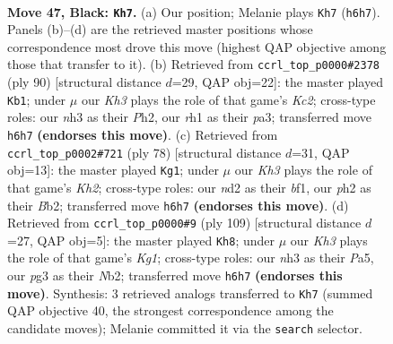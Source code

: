 \documentclass[11pt]{article}
\begin{document}
\clearpage

\begin{figure}[p]\centering
\begin{subfigure}{0.46\textwidth}\centering
\resizebox{\linewidth}{!}{%
\newchessgame
\chessboard[
  setfen={1r6/8/1pb4k/p1p1r3/8/2P2pPN/1K1N3P/7R b - - 1 47},
  showmover=false,
  pgfstyle=straightmove, color=movearrow, markmove={h6-h7}
]}
\caption{}
\end{subfigure}\hfill
\begin{subfigure}{0.46\textwidth}\centering
\resizebox{\linewidth}{!}{%
\newchessgame
\chessboard[
  setfen={r7/1p4k1/2p5/2P2R1B/3PnP2/p3P2p/2K4P/8 w - - 1 46},
  showmover=false,
  pgfstyle=straightmove, color=movearrow, markmove={c2-b1}
]}
\caption{}
\end{subfigure}
\\[4pt]
\begin{subfigure}{0.46\textwidth}\centering
\resizebox{\linewidth}{!}{%
\newchessgame
\chessboard[
  setfen={2r5/5k2/6pp/6p1/p7/P4P1P/1B1R2PK/5b2 w - - 4 40},
  showmover=false,
  pgfstyle=straightmove, color=movearrow, markmove={h2-g1}
]}
\caption{}
\end{subfigure}\hfill
\begin{subfigure}{0.46\textwidth}\centering
\resizebox{\linewidth}{!}{%
\newchessgame
\chessboard[
  setfen={6k1/R7/5p1N/p2r2pp/8/P6P/1n4PK/8 b - - 3 55},
  showmover=false,
  pgfstyle=straightmove, color=movearrow, markmove={g8-h8}
]}
\caption{}
\end{subfigure}
\caption{\textbf{Move 47, Black: \texttt{Kh7}.} (a) Our position; Melanie plays \texttt{Kh7} (\texttt{h6h7}). Panels (b)--(d) are the retrieved master positions whose correspondence most drove this move (highest QAP objective among those that transfer to it). (b) Retrieved from \texttt{ccrl\_top\_p0000\#2378} (ply 90) [structural distance $d$=29, QAP obj=22]: the master played \texttt{Kb1}; under $\mu$ our \emph{Kh3} plays the role of that game's \emph{Kc2}; cross-type roles: our \emph{n}h3 as their \emph{P}h2, our \emph{r}h1 as their \emph{p}a3; transferred move \texttt{h6h7} \textbf{(endorses this move)}. (c) Retrieved from \texttt{ccrl\_top\_p0002\#721} (ply 78) [structural distance $d$=31, QAP obj=13]: the master played \texttt{Kg1}; under $\mu$ our \emph{Kh3} plays the role of that game's \emph{Kh2}; cross-type roles: our \emph{n}d2 as their \emph{b}f1, our \emph{p}h2 as their \emph{B}b2; transferred move \texttt{h6h7} \textbf{(endorses this move)}. (d) Retrieved from \texttt{ccrl\_top\_p0000\#9} (ply 109) [structural distance $d$=27, QAP obj=5]: the master played \texttt{Kh8}; under $\mu$ our \emph{Kh3} plays the role of that game's \emph{Kg1}; cross-type roles: our \emph{n}h3 as their \emph{P}a5, our \emph{p}g3 as their \emph{N}b2; transferred move \texttt{h6h7} \textbf{(endorses this move)}. Synthesis: 3 retrieved analogs transferred to \texttt{Kh7} (summed QAP objective 40, the strongest correspondence among the candidate moves); Melanie committed it via the \texttt{search} selector.}
\label{fig:thought-m93}
\end{figure}
\end{document}
